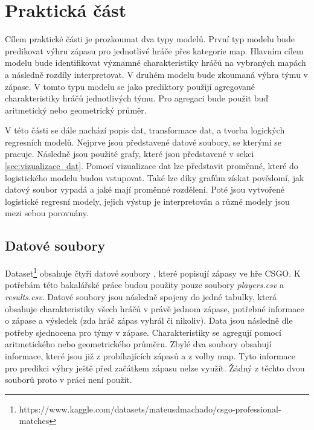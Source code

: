 \chapter{Praktická část}
{\color{red}
Cílem praktické části je prozkoumat dva typy modelů. První typ modelu bude predikovat výhru zápasu pro jednotlivé hráče přes kategorie map. Hlavním cílem 
modelu bude identifikovat významné charakteristiky hráčů na vybraných mapách a následně rozdíly interpretovat. V druhém modelu bude zkoumaná výhra týmu v zápase.
V tomto typu modelu se jako prediktory použijí agregované charakteristiky hráčů jednotlivých týmu. Pro agregaci bude použit buď aritmetický nebo geometrický průměr. 

V této části se dále nachází popis dat, transformace dat, a tvorba logických regresních modelů. Nejprve jsou představené datové soubory,
se kterými se pracuje. Následně jsou použité grafy, které jsou představené v sekci \ref{sec:vizualizace_dat}. Pomocí vizualizace dat lze představit proměnné, které
do logistického modelu budou vstupovat. Také lze díky grafům získat povědomí, jak datový soubor vypadá a jaké mají proměnné rozdělení.
Poté jsou vytvořené logistické regresní modely, jejich výstup je interpretován a různé modely jsou mezi sebou porovnány.
}

\section{Datové soubory}
Dataset\footnote{https://www.kaggle.com/datasets/mateusdmachado/csgo-professional-matches} obsahuje čtyři 
{\color{red}
datové soubory
}
, které popisují zápasy ve hře
\ac{CSGO}. K potřebám této bakalářské práce budou použity pouze soubory \textit{players.csv} a \textit{results.csv}. Datové soubory jsou následně spojeny do jedné tabulky,
která obsahuje charakteristiky všech hráčů v právě jednom zápase, potřebné informace o zápase a výsledek (zda hráč zápas vyhrál či nikoliv). Data jsou následně dle potřeby
sjednocena pro týmy v zápase. Charakteristiky se agregují pomocí aritmetického nebo geometrického průměru. Zbylé dva soubory obsahují
informace, které jsou již z probíhajících zápasů a z volby map. Tyto informace pro predikci výhry ještě před začátkem zápasu nelze využít. Žádný z těchto
dvou souborů proto v práci není použit.

